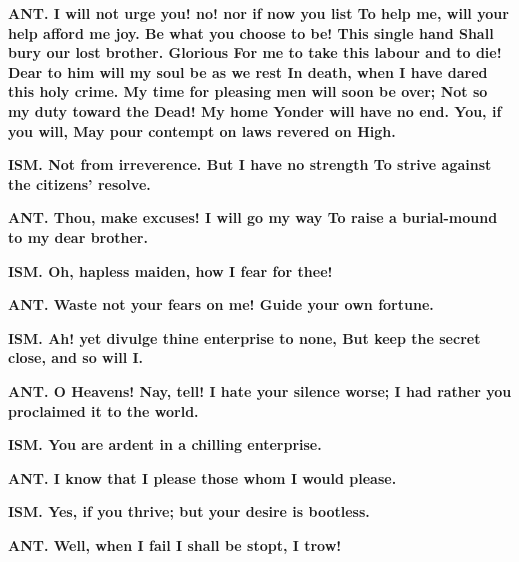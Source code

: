 \documentclass[11pt,letter]{book}
\begin{document}
\par \textbf{ANT. I will not urge you! no! nor if now you list To help me, will your help afford me joy. Be what you choose to be! This single hand Shall bury our lost brother. Glorious For me to take this labour and to die! Dear to him will my soul be as we rest In death, when I have dared this holy crime. My time for pleasing men will soon be over; Not so my duty toward the Dead! My home Yonder will have no end. You, if you will, May pour contempt on laws revered on High.}
\par 

\par \textbf{ISM. Not from irreverence. But I have no strength To strive against the citizens’ resolve.}
\par 

\par \textbf{ANT. Thou, make excuses! I will go my way To raise a burial-mound to my dear brother.}
\par 

\par \textbf{ISM. Oh, hapless maiden, how I fear for thee!}
\par 

\par \textbf{ANT. Waste not your fears on me! Guide your own fortune.}
\par 

\par \textbf{ISM. Ah! yet divulge thine enterprise to none, But keep the secret close, and so will I.}
\par 

\par \textbf{ANT. O Heavens! Nay, tell! I hate your silence worse; I had rather you proclaimed it to the world.}
\par 

\par \textbf{ISM. You are ardent in a chilling enterprise.}
\par 

\par \textbf{ANT. I know that I please those whom I would please.}
\par 

\par \textbf{ISM. Yes, if you thrive; but your desire is bootless.}
\par 

\par \textbf{ANT. Well, when I fail I shall be stopt, I trow!}
\par 
\end{document}
